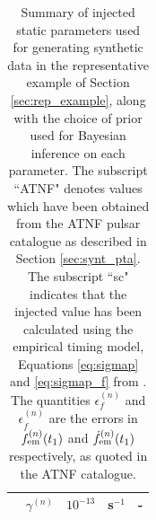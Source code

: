 \documentclass[fleqn,usenatbib,useAMS]{mnras}
\begin{document}
\begin{table}
\begin{tabular}{lccll}
		& $\gamma^{(n)}$              & $10^{-13}$ & s$^{-1}$ & - \\
		\bottomrule
	\end{tabular}
	\caption{Summary of injected static parameters used for generating synthetic data in the representative example of Section \ref{sec:rep_example}, along with the choice of prior used for Bayesian inference on each parameter. The subscript ``ATNF" denotes values which have been obtained from the ATNF pulsar catalogue as described in Section \ref{sec:synt_pta}. The subscript ``sc" indicates that the injected value has been calculated using the empirical timing model, Equations \eqref{eq:sigmap} and \eqref{eq:sigmap_f} from \protect \cite{Shannon2010}. The quantities $\epsilon^{(n)}_{f}$ and $\epsilon^{(n)}_{\dot{f}}$ are the errors in $f^{(n)}_{\rm em} (t_1)$ and $\dot{f}^{(n)}_{\rm em} (t_1)$ respectively, as quoted in the ATNF catalogue.}
	\label{tab:parameters_and_priors}
\end{table}
\end{document}
